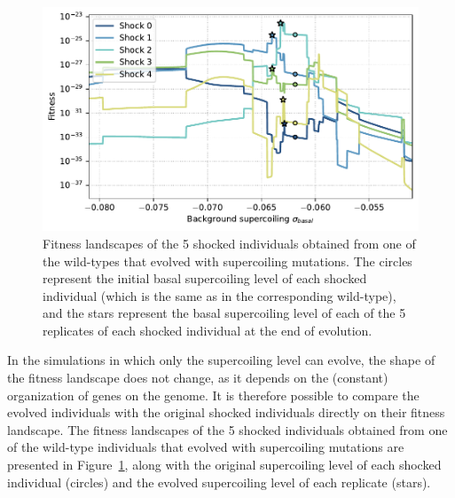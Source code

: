 \begin{figure}[H]
\centering
\includegraphics[width=\textwidth]{epistasis/img/with-sc/fitness_landscapes_wt_01_with_evolved.pdf}
\caption[Fitness landscapes with only supercoiling mutations]{Fitness landscapes of the 5 shocked individuals obtained from one of the wild-types that evolved with supercoiling mutations.
The circles represent the initial basal supercoiling level of each shocked individual (which is the same as in the corresponding wild-type), and the stars represent the basal supercoiling level of each of the 5 replicates of each shocked individual at the end of evolution.}
\label{fig:epistasis:sc-only-fitness-landscape}
\end{figure}

In the simulations in which only the supercoiling level can evolve, the shape of the fitness landscape does not change, as it depends on the  (constant) organization of genes on the genome.
It is therefore possible to compare the evolved individuals with the original shocked individuals directly on their fitness landscape.
The fitness landscapes of the 5 shocked individuals obtained from one of the wild-type individuals that evolved with supercoiling mutations are presented in Figure~\ref{fig:epistasis:sc-only-fitness-landscape}, along with the original supercoiling level of each shocked individual (circles) and the evolved supercoiling level of each replicate (stars).

